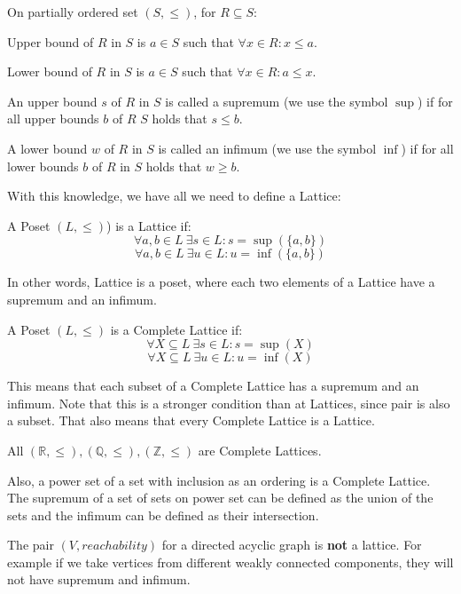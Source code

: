 \begin{defn}
    On partially ordered set $(S, \leq)$, for $R \subseteq S$:

    Upper bound of $R$ in $S$ is $a \in S$ such that $\forall x \in R: x \leq a$.

    Lower bound of $R$ in $S$ is $a \in S$ such that $\forall x \in R: a \leq x$.

    An upper bound $s$ of $R$ in $S$ is called a supremum (we use the symbol $\sup$)
    if for all upper bounds $b$ of $R$ $S$ holds that $s \leq b$.

    A lower bound $w$ of $R$ in $S$ is called an infimum (we use the symbol $\inf$)
    if for all lower bounds $b$ of $R$ in $S$ holds that $w \geq b$.
\end{defn}

With this knowledge, we have all we need to define a Lattice:
\begin{defn}[Lattice]
    A Poset $(L, \leq)$) is a Lattice if:
    \[\forall a, b \in L \: \exists s \in L: s = \sup(\{a,b\})\]
    \[\forall a, b \in L \: \exists u \in L: u = \inf(\{a,b\})\]
\end{defn}

In other words, Lattice is a poset, where each two elements of a Lattice have a supremum and an infimum.

\begin{defn}
    A Poset $(L, \leq)$ is a Complete Lattice if:
    \[\forall X \subseteq L \: \exists s \in L: s = \sup(X)\]
    \[\forall X \subseteq L \: \exists u \in L: u = \inf(X)\]
\end{defn}

This means that each subset of a Complete Lattice has a supremum and an infimum.
Note that this is a stronger condition than at Lattices, since pair is also a subset.
That also means that every Complete Lattice is a Lattice.

\begin{example}
    All $(\mathbb{R}, \leq), (\mathbb{Q}, \leq), (\mathbb{Z}, \leq)$ are Complete Lattices.

    Also, a power set of a set with inclusion as an ordering is a Complete Lattice.
    The supremum of a set of sets on power set can be defined as the union of the sets and the infimum can be defined as
    their intersection.

    The pair $(V, reachability)$ for a directed acyclic graph is \textbf{not} a lattice.
    For example if we take vertices from different weakly connected components, they will not have supremum and infimum.
\end{example}


